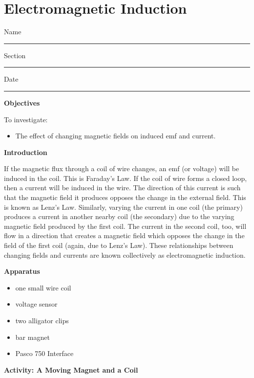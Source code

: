 \setcounter{equation}{0}
\setcounter{figure}{0}

\section{Electromagnetic Induction}

Name \rule{2.0in}{0.1pt}\hfill{}Section \rule{1.0in}{0.1pt}\hfill{}Date
\rule{1.0in}{0.1pt}

\textbf{Objectives}

To investigate:

\begin{itemize}
\item The effect of changing magnetic fields on induced emf and current.
\end{itemize}
\textbf{Introduction} 

If the magnetic flux through a coil of wire changes, an emf (or voltage) 
will be induced in the coil. This is Faraday's Law. If the coil of wire 
forms a closed loop, then a current will be induced in the wire. The direction 
of this current is such that the magnetic field it produces opposes the change 
in the external field. This is known as Lenz's Law. Similarly, varying the 
current in one coil (the primary) produces a current in another nearby coil 
(the secondary) due to the varying magnetic field produced by the first coil. 
The current in the second coil, too, will flow in a direction that creates a 
magnetic field which opposes the change in the field of the first coil (again, 
due to Lenz's Law). 
These relationships between changing fields and currents are known 
collectively as electromagnetic induction.

\textbf{Apparatus} 

\begin{itemize}
\item one small wire coil
\item voltage sensor
\item two alligator clips
\item bar magnet
\item Pasco 750 Interface
\end{itemize}

\textbf{Activity: A Moving Magnet and a Coil}

